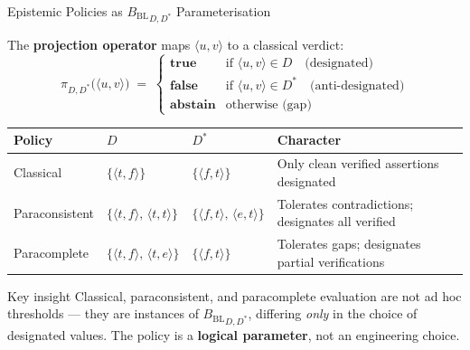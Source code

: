 \documentclass[aspectratio=169,9pt]{beamer}
\newcommand{\tv}[2]{\langle #1,#2 \rangle}
\newcommand{\BBL}{{B_{\mathrm{BL}}}}
\begin{document}
\begin{frame}{Epistemic Policies as $\BBL_{D,D^*}$ Parameterisation}

  The \textbf{projection operator} maps $\tv{u}{v}$ to a classical verdict:
  \[
    \pi_{D,D^*}\!\bigl(\tv{u}{v}\bigr) \;=\;
    \begin{cases}
      \mathbf{true}   & \text{if } \tv{u}{v} \in D \quad\text{(designated)} \\
      \mathbf{false}  & \text{if } \tv{u}{v} \in D^* \quad\text{(anti-designated)} \\
      \mathbf{abstain}& \text{otherwise (gap)}
    \end{cases}
  \]

  \medskip

  \small
  \begin{center}
  \begin{tabular}{ll@{\quad}l@{\quad}l}
    \toprule
    \textbf{Policy} & $D$ & $D^*$ & \textbf{Character} \\
    \midrule
    Classical
      & $\{\tv{t}{f}\}$
      & $\{\tv{f}{t}\}$
      & Only clean verified assertions designated \\[3pt]
    Paraconsistent
      & $\{\tv{t}{f},\, \tv{t}{t}\}$
      & $\{\tv{f}{t},\, \tv{e}{t}\}$
      & Tolerates contradictions; designates all verified \\[3pt]
    Paracomplete
      & $\{\tv{t}{f},\, \tv{t}{e}\}$
      & $\{\tv{f}{t}\}$
      & Tolerates gaps; designates partial verifications \\
    \bottomrule
  \end{tabular}
  \end{center}

  \medskip\pause

  \begin{block}{Key insight}
    \small Classical, paraconsistent, and paracomplete evaluation are not ad hoc thresholds
    — they are instances of $\BBL_{D,D^*}$, differing \emph{only} in the
    choice of designated values.
    The policy is a \textbf{logical parameter}, not an engineering choice.
  \end{block}

\end{frame}
\end{document}
